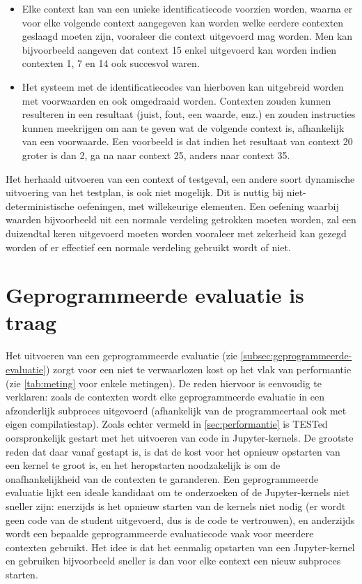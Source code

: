 \begin{itemize}
    \item Elke context kan van een unieke identificatiecode voorzien worden, waarna er voor elke volgende context aangegeven kan worden welke eerdere contexten geslaagd moeten zijn, vooraleer die context uitgevoerd mag worden.
    Men kan bijvoorbeeld aangeven dat context 15 enkel uitgevoerd kan worden indien contexten 1, 7 en 14 ook succesvol waren.
    \item Het systeem met de identificatiecodes van hierboven kan uitgebreid worden met voorwaarden en ook omgedraaid worden.
    Contexten zouden kunnen resulteren in een resultaat (juist, fout, een waarde, enz.) en zouden instructies kunnen meekrijgen om aan te geven wat de volgende context is, afhankelijk van een voorwaarde.
    Een voorbeeld is dat indien het resultaat van context 20 groter is dan 2, ga na naar context 25, anders naar context 35.
\end{itemize}

Het herhaald uitvoeren van een context of testgeval, een andere soort dynamische uitvoering van het testplan, is ook niet mogelijk.
Dit is nuttig bij niet-deterministische oefeningen, met willekeurige elementen.
Een oefening waarbij waarden bijvoorbeeld uit een normale verdeling getrokken moeten worden, zal een duizendtal keren uitgevoerd moeten worden vooraleer met zekerheid kan gezegd worden of er effectief een normale verdeling gebruikt wordt of niet.

\section{Geprogrammeerde evaluatie is traag}\label{sec:geprogrammeerde-evaluatie-is-traag}

Het uitvoeren van een geprogrammeerde evaluatie (zie \cref{subsec:geprogrammeerde-evaluatie}) zorgt voor een niet te verwaarlozen kost op het vlak van performantie (zie \cref{tab:meting} voor enkele metingen).
De reden hiervoor is eenvoudig te verklaren: zoals de contexten wordt elke geprogrammeerde evaluatie in een afzonderlijk subproces uitgevoerd (afhankelijk van de programmeertaal ook met eigen compilatiestap).
Zoals echter vermeld in \cref{sec:performantie} is TESTed oorspronkelijk gestart met het uitvoeren van code in Jupyter-kernels.
De grootste reden dat daar vanaf gestapt is, is dat de kost voor het opnieuw opstarten van een kernel te groot is, en het heropstarten noodzakelijk is om de onafhankelijkheid van de contexten te garanderen.
Een geprogrammeerde evaluatie lijkt een ideale kandidaat om te onderzoeken of de Jupyter-kernels niet sneller zijn: enerzijds is het opnieuw starten van de kernels niet nodig (er wordt geen code van de student uitgevoerd, dus is de code te vertrouwen), en anderzijds wordt een bepaalde geprogrammeerde evaluatiecode vaak voor meerdere contexten gebruikt.
Het idee is dat het eenmalig opstarten van een Jupyter-kernel en gebruiken bijvoorbeeld sneller is dan voor elke context een nieuw subproces starten.

